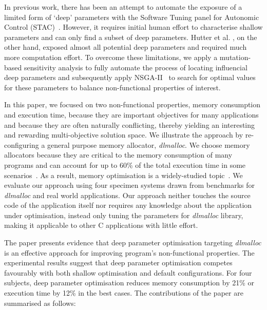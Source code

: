 In previous work, there has been an attempt to automate the exposure of a limited form of `deep' parameters with the Software Tuning panel for Autonomic Control (STAC)~\cite{Brake:2008:ADS:1370018.1370031}. However, it requires initial human effort to characterise shallow parameters and can only find a subset of deep parameters. Hutter et al. \cite{4401979}, on the other hand, exposed almost all potential deep parameters and required much more computation effort. To overcome these limitations, we apply a mutation-based sensitivity analysis to fully automate the process of locating influencial deep parameters and subsequently apply NSGA-II~\cite{996017} to search for optimal values for these parameters to balance non-functional properties of interest. 

In this paper, we focused on two non-functional properties, memory consumption and execution time, because they are important objectives for many applications and because they are often naturally conflicting, thereby yielding an interesting and rewarding multi-objective solution space. We illustrate the approach by re-configuring a general purpose memory allocator, \emph{dlmalloc}. We choose memory allocators because they are critical to the memory consumption of many programs and can account for up to 60\% of the total execution time in some scenarios~\cite{Zorn:1992:EMS:142181.142200}. As a result, memory optimisation is a widely-studied topic~\cite{RiscoMartin2010572,Risco-Martin:2009:ODM:1569901.1570116}. We evaluate our approach using four specimen systems drawn from benchmarks for \emph{dlmalloc} and real world applications. Our approach neither touches the source code of the application itself nor requires any knowledge about the application under optimisation, instead only tuning the parameters for \emph{dlmalloc} library, making it applicable to other C applications with little effort.


The paper presents evidence that deep parameter optimisation targeting \emph{dlmalloc} is an effective approach for improving program's non-functional properties. 
The experimental results suggest that deep parameter optimisation competes favourably with both shallow optimisation and default configurations. For four subjects, deep parameter optimisation reduces memory consumption by 21\% or execution time by 12\% in the best cases. The contributions of the paper are summarised as follows:

